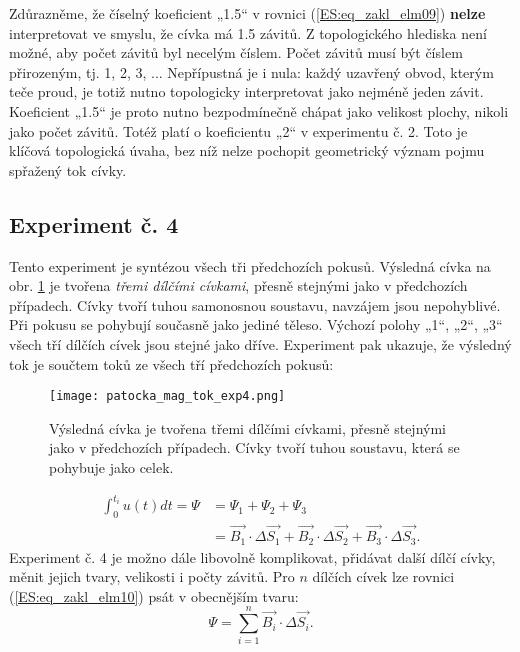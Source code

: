          Zdůrazněme, že číselný koeficient „\num{1.5}“ v rovnici (\ref{ES:eq_zakl_elm09}) 
         \textbf{nelze} interpretovat ve smyslu, že cívka má \num{1.5} závitů. Z topologického 
         hlediska není možné, aby počet závitů byl necelým číslem. Počet závitů musí být číslem 
         přirozeným, tj. 1, 2, 3, ... Nepřípustná je i nula: každý uzavřený obvod, kterým teče 
         proud, je totiž nutno topologicky interpretovat jako nejméně jeden závit. Koeficient 
         „\num{1.5}“ je proto nutno bezpodmínečně chápat jako velikost plochy, nikoli jako počet 
         závitů. Totéž platí o koeficientu „2“ v experimentu č. 2. Toto je klíčová topologická 
         úvaha, bez níž nelze pochopit geometrický význam pojmu spřažený tok cívky.
       
      \subsection{Experiment č. 4}
        Tento experiment je syntézou všech tři předchozích pokusů. Výsledná cívka na obr. 
        \ref{es:fig_patocka_mag_tok_exp4} je tvořena \emph{třemi dílčími cívkami}, přesně stejnými 
        jako v předchozích případech. Cívky tvoří tuhou samonosnou soustavu, navzájem jsou 
        nepohyblivé. Při pokusu se pohybují současně jako jediné těleso. Výchozí polohy „1“, „2“, 
        „3“ všech tří dílčích cívek jsou stejné jako dříve. Experiment pak ukazuje, že výsledný 
        tok je součtem toků ze všech tří předchozích pokusů:
        \begin{figure}[ht!]
          \centering
          \texttt{[image: patocka\_mag\_tok\_exp4.png]}
          \caption{Výsledná cívka je tvořena třemi dílčími cívkami, přesně stejnými jako v 
                   předchozích případech. Cívky tvoří tuhou soustavu, která se pohybuje 
                   jako celek. \cite[s.~14l]{Patocka4}}
          \label{es:fig_patocka_mag_tok_exp4}
        \end{figure}
        \begin{align}
          \int_0^{t_i} u(t)dt = \Psi 
            &= \Psi_1 + \Psi_2 +\Psi_3                         \nonumber \\
            &= \vec{B_1}\cdot\Delta\vec{S_1} 
             + \vec{B_2}\cdot\Delta\vec{S_2} +
               \vec{B_3}\cdot\Delta\vec{S_3}.                  \label{ES:eq_zakl_elm10}
        \end{align}
        Experiment č. 4 je možno dále libovolně komplikovat, přidávat další dílčí cívky, měnit 
        jejich tvary, velikosti i počty závitů. Pro \(n\) dílčích cívek lze rovnici 
        (\ref{ES:eq_zakl_elm10}) psát v obecnějším tvaru:
        \begin{equation}\label{ES:eq_zakl_elm11}
          \Psi = \sum_{i=1}^n\vec{B_i}\cdot\Delta\vec{S_i}.
        \end{equation}

